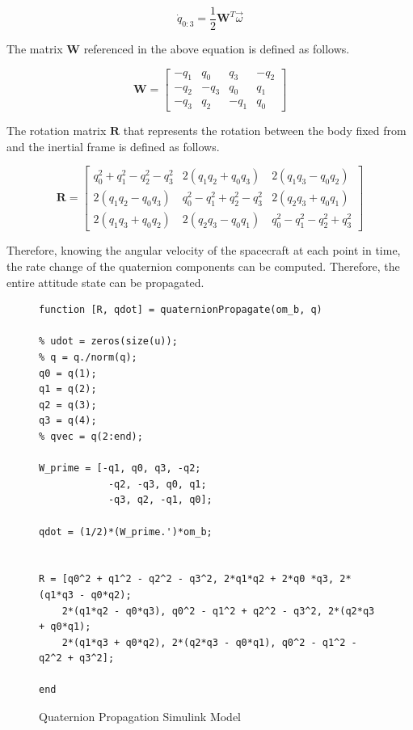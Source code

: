 \begin{equation} \label{eq:quat_rate_change}
    \dot{q}_{0:3} = \frac{1}{2} \boldsymbol{W}^T \vec{\omega}
\end{equation}

The matrix $\boldsymbol{W}$ referenced in the above equation is defined as follows.

\begin{equation*}
    \boldsymbol{W} = \begin{bmatrix}
        -q_1 & q_0 & q_3 & -q_2 \\
        -q_2 & -q_3 & q_0 & q_1 \\
        -q_3 & q_2 & -q_1 & q_0
    \end{bmatrix}
\end{equation*}

The rotation matrix $\boldsymbol{R}$ that represents the rotation between the body fixed from and the inertial frame is defined as follows.

\begin{equation*}
    \boldsymbol{R} = \begin{bmatrix}
        q_0^2 + q_1^2 - q_2^2 - q_3^2 & 2(q_1q_2 + q_0q_3) & 2(q_1q_3 - q_0q_2) \\
        2(q_1q_2 - q_0q_3) & q_0^2 - q_1^2 + q_2^2 - q_3^2 & 2(q_2q_3 + q_0q_1) \\
        2(q_1q_3 + q_0q_2) & 2(q_2q_3 - q_0q_1) & q_0^2 - q_1^2 - q_2^2 + q_3^2
    \end{bmatrix}
\end{equation*}

Therefore, knowing the angular velocity of the spacecraft at each point in time, the rate change of the quaternion components can be computed. Therefore, the entire attitude state can be propagated.

\begin{figure} [H]
    \centering
    \begin{lstlisting}
function [R, qdot] = quaternionPropagate(om_b, q)

% udot = zeros(size(u));
% q = q./norm(q);
q0 = q(1);
q1 = q(2);
q2 = q(3);
q3 = q(4);
% qvec = q(2:end);

W_prime = [-q1, q0, q3, -q2;
            -q2, -q3, q0, q1;
            -q3, q2, -q1, q0];

qdot = (1/2)*(W_prime.')*om_b;


R = [q0^2 + q1^2 - q2^2 - q3^2, 2*q1*q2 + 2*q0 *q3, 2*(q1*q3 - q0*q2);
    2*(q1*q2 - q0*q3), q0^2 - q1^2 + q2^2 - q3^2, 2*(q2*q3 + q0*q1);
    2*(q1*q3 + q0*q2), 2*(q2*q3 - q0*q1), q0^2 - q1^2 - q2^2 + q3^2];

end
    \end{lstlisting}
    \caption{Quaternion Propagation Simulink Model}
    \label{fig:quat_prop_model}
\end{figure}

